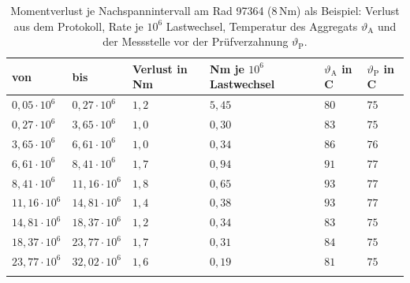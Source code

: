 \begin{table}[htbp]
	\caption{Momentverlust je Nachspannintervall am Rad 97364 ($8$\,Nm) als Beispiel: Verlust aus dem Protokoll, Rate je $10^{6}$ Lastwechsel, Temperatur des Aggregats $\vartheta_{\mathrm{A}}$ und der Messstelle vor der Prüfverzahnung $\vartheta_{\mathrm{P}}$.}
	\label{tab:verlustraten_97364}
	\centering
	\footnotesize
	\begin{tabular}{L{2.4cm}L{2.4cm}L{2.0cm}L{2.8cm}L{1.7cm}L{1.7cm}}
		von                    & bis                    & Verlust in Nm & Nm je $10^{6}$ Lastwechsel & $\vartheta_{\mathrm{A}}$ in \textdegree C & $\vartheta_{\mathrm{P}}$ in \textdegree C \\
		\hline
		$0{,}05 \cdot 10^{6}$  & $0{,}27 \cdot 10^{6}$  & $1{,}2$       & $5{,}45$                   & $80$                                      & $75$                                      \\
		\hline
		$0{,}27 \cdot 10^{6}$  & $3{,}65 \cdot 10^{6}$  & $1{,}0$       & $0{,}30$                   & $83$                                      & $75$                                      \\
		\hline
		$3{,}65 \cdot 10^{6}$  & $6{,}61 \cdot 10^{6}$  & $1{,}0$       & $0{,}34$                   & $86$                                      & $76$                                      \\
		\hline
		$6{,}61 \cdot 10^{6}$  & $8{,}41 \cdot 10^{6}$  & $1{,}7$       & $0{,}94$                   & $91$                                      & $77$                                      \\
		\hline
		$8{,}41 \cdot 10^{6}$  & $11{,}16 \cdot 10^{6}$ & $1{,}8$       & $0{,}65$                   & $93$                                      & $77$                                      \\
		\hline
		$11{,}16 \cdot 10^{6}$ & $14{,}81 \cdot 10^{6}$ & $1{,}4$       & $0{,}38$                   & $93$                                      & $77$                                      \\
		\hline
		$14{,}81 \cdot 10^{6}$ & $18{,}37 \cdot 10^{6}$ & $1{,}2$       & $0{,}34$                   & $83$                                      & $75$                                      \\
		\hline
		$18{,}37 \cdot 10^{6}$ & $23{,}77 \cdot 10^{6}$ & $1{,}7$       & $0{,}31$                   & $84$                                      & $75$                                      \\
		\hline
		$23{,}77 \cdot 10^{6}$ & $32{,}02 \cdot 10^{6}$ & $1{,}6$       & $0{,}19$                   & $81$                                      & $75$                                      \\
		\hline
	\end{tabular}
\end{table}

